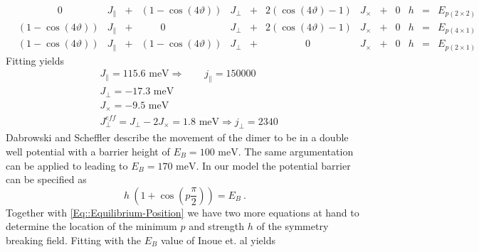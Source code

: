 	\begin{align}
		&\qquad \qquad 0&J_\parallel&+&\left(1-\cos(4\vartheta)\right)&J_\perp&+&2\left(\cos(4\vartheta) - 1\right)&J_\times&+&0&h&=& E_{p(2\times2)} \\
		&\left(1-\cos(4\vartheta) \right)&J_\parallel&+&\qquad 0&J_\perp&+&2\left(\cos(4\vartheta)-1 \right)&J_\times&+&0 &h&=& E_{p(4\times1)} \\
		&\left(1-\cos(4\vartheta) \right)&J_\parallel&
		+&\left(1 - \cos\left(4\vartheta \right)\right)&J_\perp&
		+&\qquad \qquad 0&J_\times&
		+&0&h&
		=&E_{p(2\times1)}
	\end{align}
	Fitting yields
	\begin{align}
		&J_\parallel =	115.6 \text{ meV} \Rightarrow \qquad j_\parallel =	150000 \\
		&J_\perp =	-17.3 \text{ meV} \\
		&J_\times =	-9.5 \text{ meV} \\
		&J_\perp^{eff}=	J_\perp - 2 J_\times =	1.8 \text{ meV} \Rightarrow j_\perp = 2340
	\end{align}
	Dabrowski and Scheffler \cite{dabrowski1992self} describe the movement of the dimer to be in a double well potential with a barrier height of $E_B =	100 \text{ meV}$. The same argumentation can be applied to \cite{inoue1994order} leading to $E_B =	170 \text{ meV}$. In our model the potential barrier can be specified as
	\begin{equation}
		h~(1 + \cos \left(p \frac{\pi}{2}\right)) =	E_B ~.
	\end{equation}
	Together with \autoref{Eq::Equilibrium-Position} we have two more equations at hand to determine the location of the minimum $p$ and strength $h$ of the symmetry breaking field. Fitting with the $E_B$ value of Inoue et. al yields
